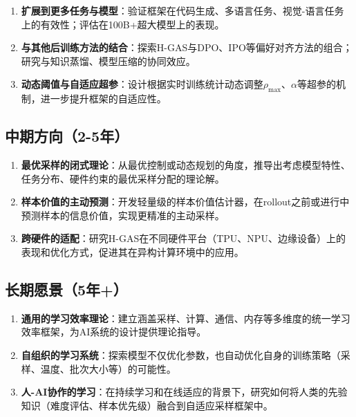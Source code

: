 \begin{enumerate}
    \item \textbf{扩展到更多任务与模型}：验证框架在代码生成、多语言任务、视觉-语言任务上的有效性；评估在100B+超大模型上的表现。
    
    \item \textbf{与其他后训练方法的结合}：探索H-GAS与DPO、IPO等偏好对齐方法的组合；研究与知识蒸馏、模型压缩的协同效应。
    
    \item \textbf{动态阈值与自适应超参}：设计根据实时训练统计动态调整$\rho_{\max}$、$\alpha$等超参的机制，进一步提升框架的自适应性。
\end{enumerate}

\subsection{中期方向（2-5年）}
\label{subsec:medium_term}

\begin{enumerate}
    \item \textbf{最优采样的闭式理论}：从最优控制或动态规划的角度，推导出考虑模型特性、任务分布、硬件约束的最优采样分配的理论解。
    
    \item \textbf{样本价值的主动预测}：开发轻量级的样本价值估计器，在rollout之前或进行中预测样本的信息价值，实现更精准的主动采样。
    
    \item \textbf{跨硬件的适配}：研究H-GAS在不同硬件平台（TPU、NPU、边缘设备）上的表现和优化方式，促进其在异构计算环境中的应用。
\end{enumerate}

\subsection{长期愿景（5年+）}
\label{subsec:long_term}

\begin{enumerate}
    \item \textbf{通用的学习效率理论}：建立涵盖采样、计算、通信、内存等多维度的统一学习效率框架，为AI系统的设计提供理论指导。
    
    \item \textbf{自组织的学习系统}：探索模型不仅优化参数，也自动优化自身的训练策略（采样、温度、批次大小等）的可能性。
    
    \item \textbf{人-AI协作的学习}：在持续学习和在线适应的背景下，研究如何将人类的先验知识（难度评估、样本优先级）融合到自适应采样框架中。
\end{enumerate}

